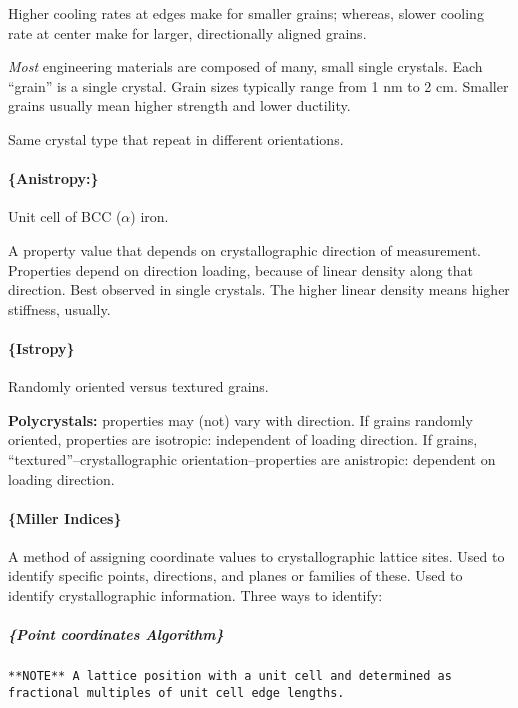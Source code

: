 \documentclass[
]{article}
\begin{document}
{Higher cooling rates at edges make for smaller grains; whereas, slower
cooling rate at center make for larger, directionally aligned grains.}

\textit{Most} engineering materials are composed of many, small single
crystals. Each ``grain'' is a single crystal. Grain sizes typically
range from 1 nm to 2 cm. Smaller grains usually mean higher strength and
lower ductility.

{Same crystal type that repeat in different orientations.}

\hypertarget{anistropy}{%
\paragraph{\{Anistropy:\}}\label{anistropy}}

{Unit cell of BCC (\(\alpha\)) iron.}

A property value that depends on crystallographic direction of
measurement. Properties depend on direction loading, because of linear
density along that direction. Best observed in single crystals. The
higher linear density means higher stiffness, usually.

\hypertarget{istropy}{%
\paragraph{\{Istropy\}}\label{istropy}}

{Randomly oriented versus textured grains.}

\textbf{Polycrystals:} properties may (not) vary with direction. If
grains randomly oriented, properties are isotropic: independent of
loading direction. If grains, ``textured''--crystallographic
orientation--properties are anistropic: dependent on loading direction.

\hypertarget{miller-indices}{%
\paragraph{\{Miller Indices\}}\label{miller-indices}}

A method of assigning coordinate values to crystallographic lattice
sites. Used to identify specific points, directions, and planes or
families of these. Used to identify crystallographic information. Three
ways to identify:

\hypertarget{point-coordinates-algorithm}{%
\subparagraph{\{Point coordinates
Algorithm\}}\label{point-coordinates-algorithm}}

\begin{verbatim}
**NOTE** A lattice position with a unit cell and determined as fractional multiples of unit cell edge lengths.
\end{verbatim}
\end{document}
